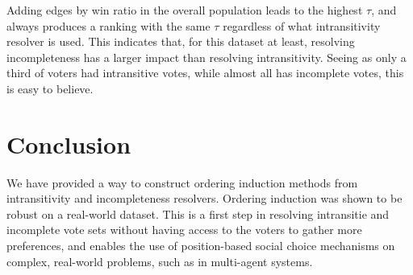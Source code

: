 \documentclass[letterpaper]{article} %
\begin{document}
\renewcommand{\arraystretch}{1.2}
\begin{table}
\end{table}

Adding edges by win ratio in the overall population leads to the highest $\tau$, and always produces a ranking with the same $\tau$ regardless of what intransitivity resolver is used. This indicates that, for this dataset at least, resolving incompleteness has a larger impact than resolving intransitivity. Seeing as only a third of voters had intransitive votes, while almost all has incomplete votes, this is easy to believe.

\section{Conclusion}
We have provided a way to construct ordering induction methods from intransitivity and incompleteness resolvers. Ordering induction was shown to be robust on a real-world dataset. This is a first step in resolving intransitie and incomplete vote sets without having access to the voters to gather more preferences, and enables the use of position-based social choice mechanisms on complex, real-world problems, such as in multi-agent systems.



\end{document}

